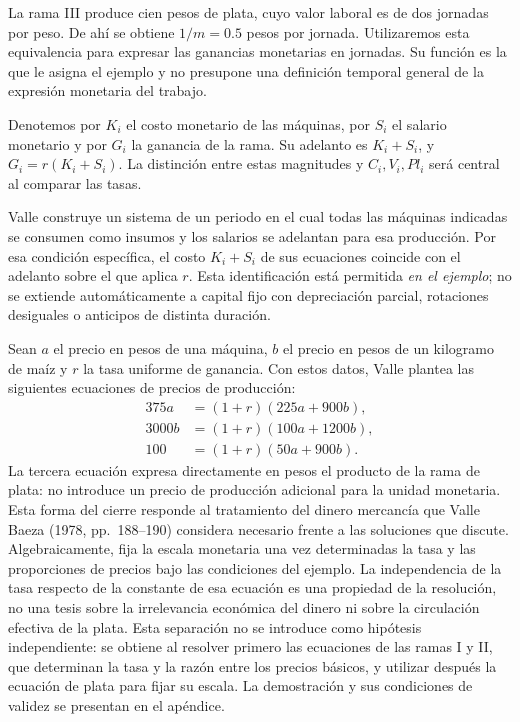 \documentclass[10pt,twoside]{article}
\begin{document}
La rama III produce cien pesos de plata, cuyo valor laboral es de dos jornadas por peso. De ahí se obtiene $1/m=0.5$ pesos por jornada. Utilizaremos esta equivalencia para expresar las ganancias monetarias en jornadas. Su función es la que le asigna el ejemplo y no presupone una definición temporal general de la expresión monetaria del trabajo.

Denotemos por $K_i$ el costo monetario de las máquinas, por $S_i$ el salario monetario y por $G_i$ la ganancia de la rama. Su adelanto es $K_i+S_i$, y $G_i=r(K_i+S_i)$. La distinción entre estas magnitudes y $C_i,V_i,Pl_i$ será central al comparar las tasas.

Valle construye un sistema de un periodo en el cual todas las máquinas indicadas se consumen como insumos y los salarios se adelantan para esa producción. Por esa condición específica, el costo $K_i+S_i$ de sus ecuaciones coincide con el adelanto sobre el que aplica $r$. Esta identificación está permitida \emph{en el ejemplo}; no se extiende automáticamente a capital fijo con depreciación parcial, rotaciones desiguales o anticipos de distinta duración. 

Sean $a$ el precio en pesos de una máquina, $b$ el precio en pesos de un kilogramo de maíz y $r$ la tasa uniforme de ganancia. Con estos datos, Valle plantea las siguientes ecuaciones de precios de producción:
\begin{align}
375a&=(1+r)(225a+900b),\label{eq:valle1}\\
3000b&=(1+r)(100a+1200b),\label{eq:valle2}\\
100&=(1+r)(50a+900b).\label{eq:valle3}
\end{align}
La tercera ecuación expresa directamente en pesos el producto de la rama de plata: no introduce un precio de producción adicional para la unidad monetaria. Esta forma del cierre responde al tratamiento del dinero mercancía que Valle Baeza (1978, pp.~188--190) considera necesario frente a las soluciones que discute. Algebraicamente, fija la escala monetaria una vez determinadas la tasa y las proporciones de precios bajo las condiciones del ejemplo. La independencia de la tasa respecto de la constante de esa ecuación es una propiedad de la resolución, no una tesis sobre la irrelevancia económica del dinero ni sobre la circulación efectiva de la plata. Esta separación no se introduce como hipótesis independiente: se obtiene al resolver primero las ecuaciones de las ramas I y II, que determinan la tasa y la razón entre los precios básicos, y utilizar después la ecuación de plata para fijar su escala. La demostración y sus condiciones de validez se presentan en el apéndice.
\end{document}
